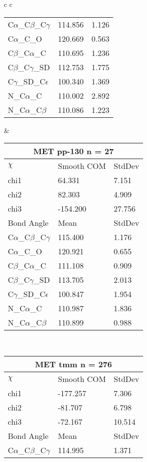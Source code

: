 \begin{longtable}{ c c }
\begin{tabular}{ l l l }
  C$\alpha$\_C$\beta$\_C$\gamma$ & 114.856 & 1.126\\
  C$\alpha$\_C\_O & 120.669 & 0.563\\
  C$\beta$\_C$\alpha$\_C & 110.695 & 1.236\\
  C$\beta$\_C$\gamma$\_SD & 112.753 & 1.775\\
  C$\gamma$\_SD\_C$\epsilon$ & 100.340 & 1.369\\
  N\_C$\alpha$\_C & 110.002 & 2.892\\
  N\_C$\alpha$\_C$\beta$ & 110.086 & 1.223\\
  \bottomrule
  \end{tabular}
  &
  \begin{tabular}{ l l l }
  \toprule
  \multicolumn{3}{c}{MET \textbf{pp-130} n = 27} \\ \toprule
  $\chi$       & Smooth COM & StdDev \\ \midrule
  chi1 & 64.331 & 7.151 \\ 
  chi2 & 82.303 & 4.909 \\ 
  chi3 & -154.200 & 27.756 \\ \midrule
  Bond Angle   & Mean     & StdDev \\ \midrule
  C$\alpha$\_C$\beta$\_C$\gamma$ & 115.400 & 1.176\\
  C$\alpha$\_C\_O & 120.921 & 0.655\\
  C$\beta$\_C$\alpha$\_C & 111.108 & 0.909\\
  C$\beta$\_C$\gamma$\_SD & 113.705 & 2.013\\
  C$\gamma$\_SD\_C$\epsilon$ & 100.847 & 1.954\\
  N\_C$\alpha$\_C & 110.987 & 1.836\\
  N\_C$\alpha$\_C$\beta$ & 110.899 & 0.988\\
  \bottomrule
  \end{tabular}
  \\
  \begin{tabular}{ l l l }
  \toprule
  \multicolumn{3}{c}{MET \textbf{tmm} n = 276} \\ \toprule
  $\chi$       & Smooth COM & StdDev \\ \midrule
  chi1 & -177.257 & 7.306 \\ 
  chi2 & -81.707 & 6.798 \\ 
  chi3 & -72.167 & 10.514 \\ \midrule
  Bond Angle   & Mean     & StdDev \\ \midrule
  C$\alpha$\_C$\beta$\_C$\gamma$ & 114.995 & 1.371\\

\end{tabular}
\end{longtable}
